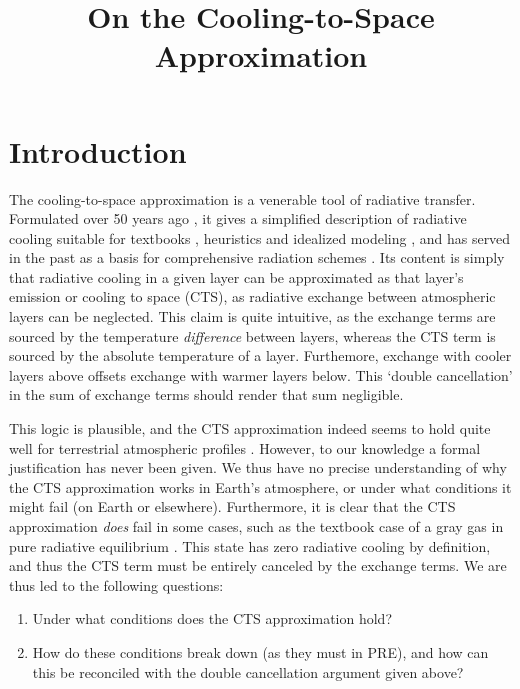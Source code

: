 \documentclass{ametsoc}
\title{On the Cooling-to-Space Approximation}
\affiliation{Princeton University, Princeton, New Jersey}
\begin{document}
\maketitle


%
\section {Introduction}
The cooling-to-space approximation is a venerable tool of radiative transfer. Formulated over 50 years ago \citep{zagoni2016, green1967, rodgers1966}, it gives a simplified description of radiative cooling suitable for textbooks \citep{wallace2006,petty2006,thomas2002}, heuristics and idealized modeling \citep[][]{jeevanjee2018,jeevanjee2019a}, and  has served in the past as a basis for comprehensive radiation schemes  \citep[][]{joseph1976,fels1975,rodgers1966}. Its content is simply that radiative cooling in a given layer can be approximated as that layer's emission or cooling to space (CTS), as radiative exchange between atmospheric layers can be neglected. This claim  is quite intuitive, as  the  exchange terms   are sourced by the temperature \emph{difference} between layers, whereas the CTS term is sourced by the absolute temperature of a layer. Furthemore,   exchange with cooler layers above  offsets  exchange with warmer layers below. This `double cancellation' in the sum of exchange terms should render that sum negligible.

This logic is plausible, and the CTS approximation indeed seems to hold quite well for terrestrial atmospheric profiles \citep[e.g.][as well as Fig. \ref{realgas_decomp_h2o} below]{clough1992,rodgers1966}.  However, to our knowledge a formal justification has never been given. We thus have no precise understanding of why the CTS approximation works in Earth's atmosphere, or under what conditions  it might fail (on Earth or elsewhere). Furthermore, it is clear that the CTS approximation  \emph{does} fail in some cases, such as the textbook case of a gray gas in pure radiative equilibrium \citep[PRE, e.g.][]{pierrehumbert2010}. This state has zero radiative cooling by definition, and thus the CTS term must be entirely canceled by the exchange terms.  We are thus led to the following questions:

\begin{enumerate}
	\item Under what conditions does the CTS approximation  hold? \label{rce_valid}
	\item How do these conditions break down (as they must in PRE), and how can this be reconciled with the double cancellation argument given above?  \label{pre_invalid}
\end{enumerate}
\end{document}
